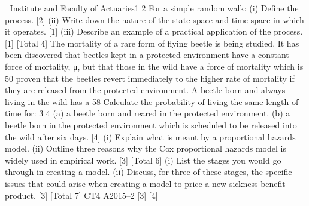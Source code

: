 \documentclass[a4paper,12pt]{article}
\begin{document}
\begin{enumerate}

 Institute and Faculty of Actuaries1
2
For a simple random walk:
(i) Define the process.
[2]
(ii) Write down the nature of the state space and time space in which it operates.
[1]
(iii) Describe an example of a practical application of the process.
[1]
[Total 4]
The mortality of a rare form of flying beetle is being studied. It has been discovered
that beetles kept in a protected environment have a constant force of mortality, μ, but
that those in the wild have a force of mortality which is 50%
proven that the beetles revert immediately to the higher rate of mortality if they are
released from the protected environment.
A beetle born and always living in the wild has a 58%
Calculate the probability of living the same length of time for:
3
4
(a) a beetle born and reared in the protected environment.
(b) a beetle born in the protected environment which is scheduled to be released
into the wild after six days.
[4]
(i) Explain what is meant by a proportional hazards model.
(ii) Outline three reasons why the Cox proportional hazards model is widely used
in empirical work.
[3]
[Total 6]
(i) List the stages you would go through in creating a model.
(ii) Discuss, for three of these stages, the specific issues that could arise when
creating a model to price a new sickness benefit product.
[3]
[Total 7]
CT4 A2015–2
[3]
[4]


\end{enumerate}
\end{document}
